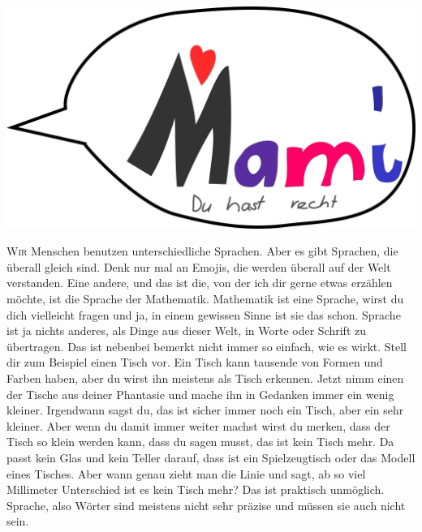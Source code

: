 ﻿\thispagestyle{empty}
\begin{center}
\includegraphics[width=\textwidth]{./bilder/fangen.png}
\end{center}
\vspace\times{\fill}
{\centering\fontsize{50}{48} \color{farbe}\par}
\newpage
\lettrine[lines=3, lhang=.2, loversize=.25, lraise=0.05, findent=0.1em,nindent=0em]{W}{ir} Menschen benutzen unterschiedliche Sprachen. Aber es gibt Sprachen, die überall gleich sind. Denk nur mal an Emojis, die werden überall auf der Welt verstanden. Eine andere, und das ist die, von der ich dir gerne etwas erzählen möchte, ist die Sprache der Mathematik. Mathematik ist eine Sprache, wirst du dich vielleicht fragen und ja, in einem gewissen Sinne ist sie das schon. Sprache ist ja nichts anderes, als Dinge aus dieser Welt, in Worte oder Schrift zu übertragen. Das ist nebenbei bemerkt nicht immer so einfach, wie es wirkt. Stell dir zum Beispiel einen Tisch vor. Ein Tisch kann tausende von Formen und Farben haben, aber du wirst ihn meistens als Tisch erkennen. Jetzt nimm einen der Tische aus deiner Phantasie und mache ihn in Gedanken immer ein wenig kleiner. Irgendwann sagst du, das ist sicher immer noch ein Tisch, aber ein sehr kleiner. Aber wenn du damit immer weiter machst wirst du merken, dass der Tisch so klein werden kann, dass du sagen musst, das ist kein Tisch mehr. Da passt kein Glas und kein Teller darauf, dass ist ein Spielzeugtisch oder das Modell eines Tisches. Aber wann genau zieht man die Linie und sagt, ab so viel Millimeter Unterschied ist es kein Tisch mehr? Das ist praktisch unmöglich. Sprache, also Wörter sind meistens nicht sehr präzise und müssen sie auch nicht sein.

